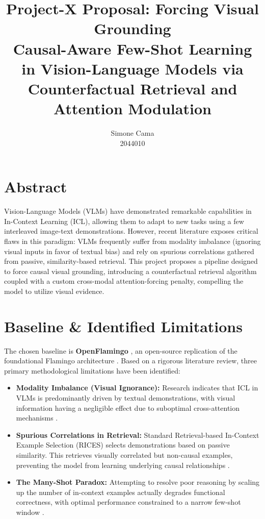 \documentclass[11pt, letterpaper]{article}
\title{\textbf{Project-X Proposal: Forcing Visual Grounding}\\
\large Causal-Aware Few-Shot Learning in Vision-Language Models via Counterfactual Retrieval and Attention Modulation}
\author{Simone Cama \\ 2044010}
\date{}
\begin{document}
\maketitle
\vspace{-1cm} %

\section*{Abstract}
Vision-Language Models (VLMs) have demonstrated remarkable capabilities in In-Context Learning (ICL), allowing them to adapt to new tasks using a few interleaved image-text demonstrations. However, recent literature exposes critical flaws in this paradigm: VLMs frequently suffer from modality imbalance (ignoring visual inputs in favor of textual bias) and rely on spurious correlations gathered from passive, similarity-based retrieval. This project proposes a pipeline designed to force causal visual grounding, introducing a counterfactual retrieval algorithm coupled with a custom cross-modal attention-forcing penalty, compelling the model to utilize visual evidence.

\section{Baseline \& Identified Limitations}
The chosen baseline is \textbf{OpenFlamingo} \cite{awadalla2023openflamingo}, an open-source replication of the foundational Flamingo architecture \cite{flamingo}. Based on a rigorous literature review, three primary methodological limitations have been identified:
\begin{itemize}[noitemsep, topsep=2pt]
    \item \textbf{Modality Imbalance (Visual Ignorance):} Research indicates that ICL in VLMs is predominantly driven by textual demonstrations, with visual information having a negligible effect due to suboptimal cross-attention mechanisms \cite{chen2024understanding}.
    \item \textbf{Spurious Correlations in Retrieval:} Standard Retrieval-based In-Context Example Selection (RICES) selects demonstrations based on passive similarity. This retrieves visually correlated but non-causal examples, preventing the model from learning underlying causal relationships \cite{xiong2026retrieving}.
    \item \textbf{The Many-Shot Paradox:} Attempting to resolve poor reasoning by scaling up the number of in-context examples actually degrades functional correctness, with optimal performance constrained to a narrow few-shot window \cite{oskooei2025many}.
\end{itemize}
\end{document}
